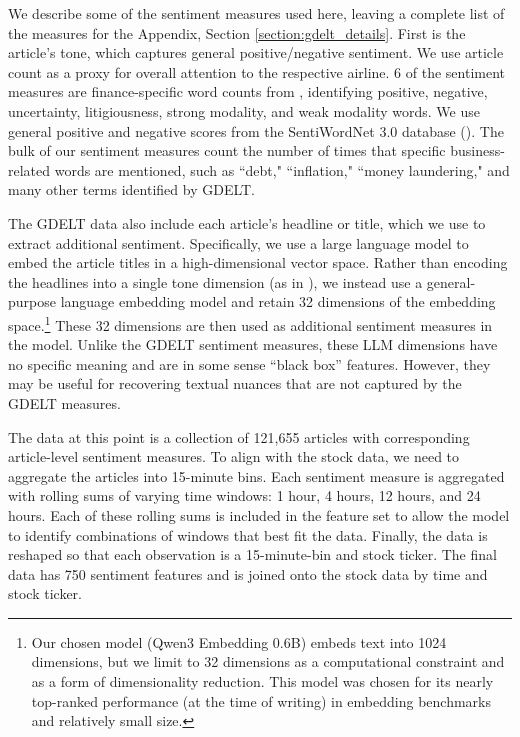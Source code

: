 \documentclass[12pt]{article}
\begin{document}
We describe some of the sentiment measures used here, leaving a complete list of the measures for the Appendix, Section \ref{section:gdelt_details}. First is the article's tone, which captures general positive/negative sentiment. We use article count as a proxy for overall attention to the respective airline. 6 of the sentiment measures are finance-specific word counts from \textcite{loughran2011liability}, identifying positive, negative, uncertainty, litigiousness, strong modality, and weak modality words. We use general positive and negative scores from the SentiWordNet 3.0 database (\textcite{baccianella2010sentiwordnet}). The bulk of our sentiment measures count the number of times that specific business-related words are mentioned, such as ``debt," ``inflation," ``money laundering," and many other terms identified by GDELT.

The GDELT data also include each article's headline or title, which we use to extract additional sentiment. Specifically, we use a large language model to embed the article titles in a high-dimensional vector space. Rather than encoding the headlines into a single tone dimension (as in \textcite{huang2023finbert}), we instead use a general-purpose language embedding model and retain 32 dimensions of the embedding space.\footnote{Our chosen model (Qwen3 Embedding 0.6B) embeds text into 1024 dimensions, but we limit to 32 dimensions as a computational constraint and as a form of dimensionality reduction. This model was chosen for its nearly top-ranked performance (at the time of writing) in embedding benchmarks and relatively small size.} These 32 dimensions are then used as additional sentiment measures in the model. Unlike the GDELT sentiment measures, these LLM dimensions have no specific meaning and are in some sense ``black box'' features. However, they may be useful for recovering textual nuances that are not captured by the GDELT measures.

The data at this point is a collection of 121,655 articles with corresponding article-level sentiment measures. To align with the stock data, we need to aggregate the articles into 15-minute bins. Each sentiment measure is aggregated with rolling sums of varying time windows: 1 hour, 4 hours, 12 hours, and 24 hours. Each of these rolling sums is included in the feature set to allow the model to identify combinations of windows that best fit the data. Finally, the data is reshaped so that each observation is a 15-minute-bin and stock ticker. The final data has 750 sentiment features and is joined onto the stock data by time and stock ticker.
\end{document}

